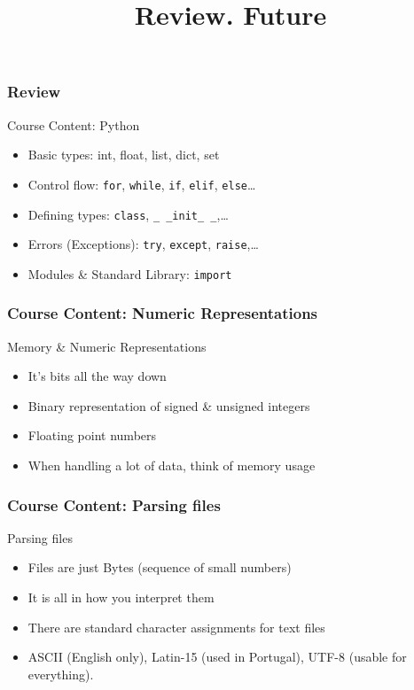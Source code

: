 
\title{Review. Future}

\frame{\maketitle}

\begin{frame}[fragile]
\frametitle{Review}

\begin{block}{Course Content: Python}
\begin{itemize}
\item Basic types: int, float, list, dict, set
\item Control flow: \lstinline{for}, \lstinline{while}, \lstinline{if}, \lstinline{elif}, \lstinline{else}\ldots
\item Defining types: \lstinline{class}, \lstinline{_ _init_ _},\ldots
\item Errors (Exceptions): \lstinline{try}, \lstinline{except}, \lstinline{raise},\ldots
\item Modules \& Standard Library: \lstinline{import}
\end{itemize}
\end{block}

\end{frame}

\begin{frame}[fragile]
\frametitle{Course Content: Numeric Representations}
\begin{block}{Memory \& Numeric Representations}
\begin{itemize}
\item It's bits all the way down
\item Binary representation of signed \& unsigned integers
\item Floating point numbers
\item When handling a lot of data, think of memory usage
\end{itemize}
\end{block}
\end{frame}

\begin{frame}[fragile]
\frametitle{Course Content: Parsing files}

\begin{block}{Parsing files}
\begin{itemize}
\item Files are just Bytes (sequence of small numbers)
\item It is all in how you interpret them
\item There are standard character assignments for text files
\item ASCII (English only), Latin-15 (used in Portugal), UTF-8 (usable for everything).
\end{itemize}
\end{block}
\end{frame}


